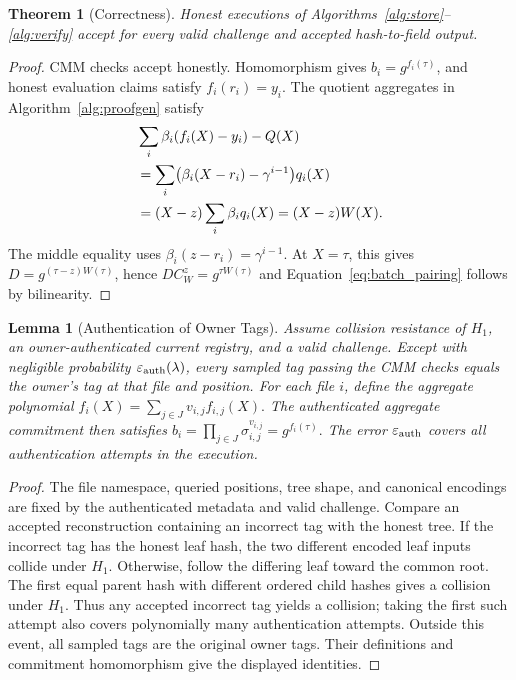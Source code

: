 \documentclass[lettersize,journal]{IEEEtran}
\newtheorem{theorem}{Theorem}
\newtheorem{lemma}{Lemma}
\begin{document}
\begin{theorem}[Correctness]\label{thm:correctness}
Honest executions of Algorithms~\ref{alg:store}--\ref{alg:verify} accept for every valid challenge and accepted hash-to-field output.
\end{theorem}
\begin{proof}
CMM checks accept honestly. Homomorphism gives $b_i=g^{f_i(\tau)}$, and honest evaluation claims satisfy $f_i(r_i)=y_i$. The quotient aggregates in Algorithm~\ref{alg:proofgen} satisfy
\begin{equation}
\begin{split}
&\sum_i\beta_i(f_i(X)-y_i)-Q(X)\\
&=\sum_i\bigl(\beta_i(X-r_i)-\gamma^{i-1}\bigr)q_i(X)\\
&=(X-z)\sum_i\beta_iq_i(X)=(X-z)W(X).
\end{split}\notag
\end{equation}
The middle equality uses $\beta_i(z-r_i)=\gamma^{i-1}$. At $X=\tau$, this gives $D=g^{(\tau-z)W(\tau)}$, hence $DC_W^z=g^{\tau W(\tau)}$ and Equation~\eqref{eq:batch_pairing} follows by bilinearity.
\end{proof}

\begin{lemma}[Authentication of Owner Tags]\label{lem:tag_authentication}
Assume collision resistance of $H_1$, an owner-authenticated current registry, and a valid challenge. Except with negligible probability $\varepsilon_{\rm auth}(\lambda)$, every sampled tag passing the CMM checks equals the owner's tag at that file and position. For each file $i$, define the aggregate polynomial $
f_i(X)=\sum_{j\in J}v_{i,j}f_{i,j}(X).$ The authenticated aggregate commitment then satisfies $b_i=\prod_{j\in J}\sigma_{i,j}^{v_{i,j}}=g^{f_i(\tau)}.$
The error $\varepsilon_{\rm auth}$ covers all authentication attempts in the execution.
\end{lemma}
\begin{proof}
The file namespace, queried positions, tree shape, and canonical encodings are fixed by the authenticated metadata and valid challenge. Compare an accepted reconstruction containing an incorrect tag with the honest tree. If the incorrect tag has the honest leaf hash, the two different encoded leaf inputs collide under $H_1$. Otherwise, follow the differing leaf toward the common root. The first equal parent hash with different ordered child hashes gives a collision under $H_1$. Thus any accepted incorrect tag yields a collision; taking the first such attempt also covers polynomially many authentication attempts. Outside this event, all sampled tags are the original owner tags. Their definitions and commitment homomorphism give the displayed identities.
\end{proof}
\end{document}
